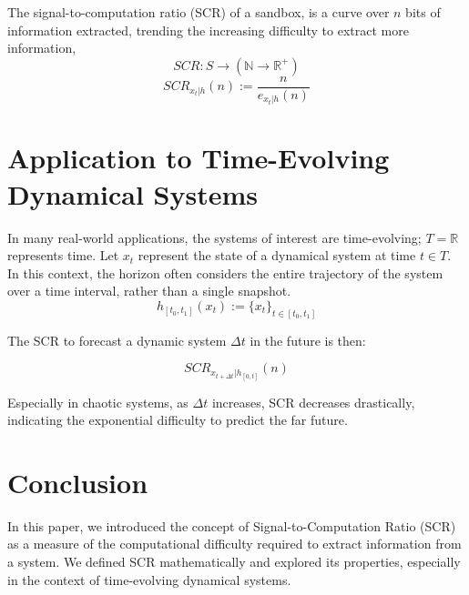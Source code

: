 \documentclass[11pt,a4paper]{article}
\theoremstyle{definition}
\theoremstyle{remark}
\numberwithin{equation}{section}
\begin{document}
The signal-to-computation ratio (SCR) of a sandbox, is a curve over $n$ bits of information extracted, trending the increasing difficulty to extract more information,
\[
SCR : S \rightarrow (\mathbb{N} \rightarrow \mathbb{R}^+)
\]
\[
SCR_{x_t|h}(n) := \frac{n}{e_{x_t|h}(n)}
\]

\section{Application to Time-Evolving Dynamical Systems}
In many real-world applications, the systems of interest are time-evolving; $T = \mathbb{R}$ represents time. Let \(x_t\) represent the state of a dynamical system at time \(t \in T\). 
In this context, the horizon often considers the entire trajectory of the system over a time interval, rather than a single snapshot.
\[
h_{[t_0,t_1]}(x_t) := \{ x_t      \}_{ t\in  [t_0,t_1] }
\]

The SCR to forecast a dynamic system $\Delta t$ in the future is then:

\[
SCR_{x_{t+\Delta t} | h_{[0,t]}}(n)
\]

Especially in chaotic systems, as $\Delta t$ increases, SCR decreases drastically, indicating the exponential difficulty to predict the far future. 

\section{Conclusion}
In this paper, we introduced the concept of Signal-to-Computation Ratio (SCR) as a measure of the computational difficulty required to extract information from a system. We defined SCR mathematically and explored its properties, especially in the context of time-evolving dynamical systems. 




\end{document}
